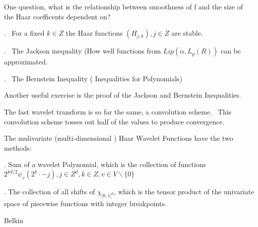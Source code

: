 \documentclass{article}
\begin{document}
\bigskip

One question, what is the relationship between smoothness of f and the size
of the Haar coefficents dependent on?

. \ For a fixed $k\in Z$ the Haar functions $(H_{j,k}),j\in Z$ are
stable.

. \ The Jackson inequality (How well functions from $Lip(\alpha
,L_{p}(R))$ can be approximated.

. \ The Bernstein Inequality ( Inequalities for Polynomials)

\bigskip

Another useful exercise is the proof of the Jackson and Bernstein
Inequalities.

\bigskip

The fast wavelet transform is so far the same, a convolution scheme. \ This
convolution scheme tosses out half of the values to produce convergence.

\bigskip

The mulivariate (multi-dimensional ) Haar Wavelet Functions have the two
methods:

. Sum of a wavelet Polynomial, which is the collection of functions $%
2^{kd/2}\psi _{v}(2^{k}\cdot -j),j\in Z^{d},k\in Z,v\in V\backslash \{0\}$

. The collection of all shifts of $\chi _{\lbrack 0,1]^{d}}$, which
is the tensor product of the univariate space of piecewise functions with
integer breakpoints.

\bigskip 

Belkin
\end{document}
